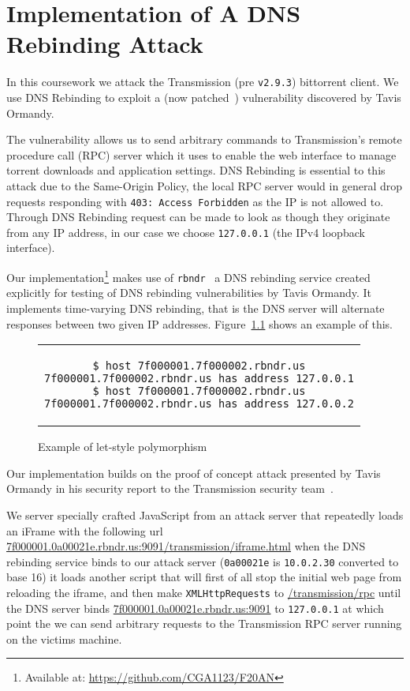 \chapter{Implementation of A DNS Rebinding Attack}
\label{implementation}

In this coursework we attack the Transmission (pre \texttt{v2.9.3}) bittorrent
client. We use DNS Rebinding to exploit a (now patched~\cite{transmission_pr})
vulnerability discovered by Tavis Ormandy.

The vulnerability allows us to send arbitrary commands to Transmission's remote
procedure call (RPC) server which it uses to enable the web interface to manage
torrent downloads and application settings. DNS Rebinding is essential to this
attack due to the Same-Origin Policy, the local RPC server would in general
drop requests responding with \texttt{403: Access Forbidden} as the IP is not
allowed to. Through DNS Rebinding request can be made to look as though they
originate from any IP address, in our case we choose \texttt{127.0.0.1} (the
IPv4 loopback interface).

Our implementation\footnote{Available at:
\url{https://github.com/CGA1123/F20AN}} makes use of
\texttt{rbndr}~\cite{rbndr} a DNS rebinding service created explicitly for
testing of DNS rebinding vulnerabilities by Tavis Ormandy. It implements
time-varying DNS rebinding, that is the DNS server will alternate responses
between two given IP addresses. Figure~\ref{rbndr_host} shows an example of
this.

\begin{figure}[H]
\begin{center}
\begin{tabular}{c}
\begin{lstlisting}
$ host 7f000001.7f000002.rbndr.us
7f000001.7f000002.rbndr.us has address 127.0.0.1
$ host 7f000001.7f000002.rbndr.us
7f000001.7f000002.rbndr.us has address 127.0.0.2
\end{lstlisting}
\end{tabular}
\end{center}
\caption{Example of let-style polymorphism}
\label{rbndr_host}
\end{figure}

Our implementation builds on the proof of concept attack presented by Tavis
Ormandy in his security report to the Transmission security
team~\cite{tavis_report}.

We server specially crafted JavaScript from an attack server that repeatedly
loads an iFrame with the following url
\url{7f000001.0a00021e.rbndr.us:9091/transmission/iframe.html} when the DNS
rebinding service binds to our attack server (\texttt{0a00021e} is
\texttt{10.0.2.30} converted to base 16) it loads another script that will
first of all stop the initial web page from reloading the iframe, and then make
\texttt{XMLHttpRequests} to \url{/transmission/rpc} until the DNS server binds
\url{7f000001.0a00021e.rbndr.us:9091} to \texttt{127.0.0.1} at which point the
we can send arbitrary requests to the Transmission RPC server running on the
victims machine.

